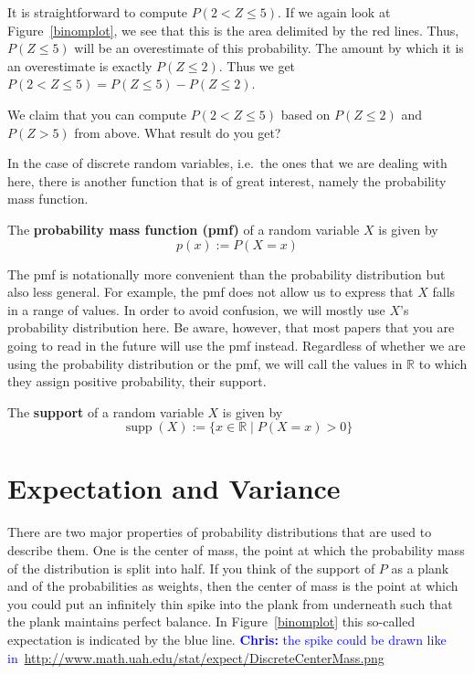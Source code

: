 \documentclass[a4paper,11pt,leqno]{report}
\newcommand{\chris}[1]{ \textcolor{blue}{\textbf{Chris:} #1}}
\newcommand{\supp}{\operatorname{supp}}
\begin{document}
It is straightforward to compute $ P(2 < Z \leq 5) $. If we again look at Figure~\ref{binomplot}, we see that this is
the area delimited by the red lines. Thus, $ P(Z \leq 5) $ will be an overestimate of this probability. The amount by
which it is an overestimate is exactly $ P(Z \leq 2) $. Thus we get $ P(2 < Z \leq 5) = P(Z \leq 5) - P(Z \leq 2) $.

\begin{Exercise}
We claim that you can compute $ P(2 < Z \leq 5) $ based on $ P(Z \leq 2) $ and $ P(Z > 5) $ from above. What result do
you get?
\end{Exercise}

In the case of discrete random variables, i.e.\ the ones that we are dealing with here, there is another function that is of great interest, namely the probability mass function.

\begin{Definition}
The \textbf{probability mass function (pmf)} of a random variable $ X $ is given by
$$ p(x) := P(X = x) $$
\end{Definition}

The pmf is notationally more convenient than the probability distribution but also less general. For example, the pmf does not
allow us to express that $ X $ falls in a range of values. In order to avoid confusion, we will mostly use $ X $'s 
probability distribution here. Be aware, however, that most papers that you are going to read in the future will use the pmf
instead. Regardless of whether we are using the probability distribution or the pmf, we will call the values in $ \mathbb{R} $
to which they assign positive probability, their support.

\begin{Definition}
The \textbf{support} of a random variable $ X $ is given by
$$ \supp(X) := \{x \in \mathbb{R} \mid P(X=x)>0 \} $$
\end{Definition}




\section{Expectation and Variance}

There are two major properties of probability distributions that are used to describe them. One is the center of mass, the point
at which the probability mass of the distribution is split into half. If you think of the support of $ P $ as a plank and 
of the probabilities as weights, then the center of mass is the point at which you could put an infinitely thin spike into the
plank from underneath such that the plank maintains perfect balance. In Figure~\ref{binomplot} this so-called expectation
is indicated by the blue line. \chris{the spike could be drawn like in~\url{http://www.math.uah.edu/stat/expect/DiscreteCenterMass.png}}
\end{document}
